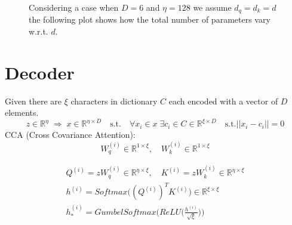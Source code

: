 \documentclass{article}
\begin{document}
\begin{center}
\begin{figure}[h]
\caption{Considering a case when $D = 6$ and $\eta = 128$ we assume $d_{q} = d_{k} =d$ the following plot shows how the total number of parameters vary w.r.t. $d$.}
\end{figure}
\end{center}

\section{Decoder}

Given there are $\xi$ characters in dictionary $C$ each encoded with a vector of $D$ elements.
\begin{equation}
	z \in \mathbb{R}^{\eta} \; \Rightarrow \; x \in \mathbb{R}^{\eta \times D} \quad \text{s.t.} \quad \forall x_{i} \in x \;\exists c_{i} \in C\in \mathbb{R}^{\xi \times D} \quad \text{s.t.} \vert\vert x_{i} - c_{i} \vert\vert = 0
\end{equation}
CCA (Cross Covariance Attention): 
\begin{equation}
	W_{q}^{(i)} \in \mathbb{R}^{1 \times \xi}, \quad W_{k}^{(i)} \in \mathbb{R}^{1 \times \xi}
\end{equation}

\begin{eqnarray}
	Q^{(i)} = z W_q^{(i)} \in \mathbb{R}^{\eta \times \xi}, \quad K^{(i)} = z W_k^{(i)} \in \mathbb{R}^{\eta \times \xi} \\
	h^{(i)} = \textit{Softmax}\Big((Q^{(i)})^T K^{(i)}\Big) \in \mathbb{R}^{\xi \times \xi} \\
	h_{*}^{(i)} = \textit{GumbelSoftmax}\Bigg(\textit{ReLU}\Bigg(\frac{h^{(i)}}{\sqrt{\xi}}\Bigg)\Bigg)
\end{eqnarray}
\end{document}
